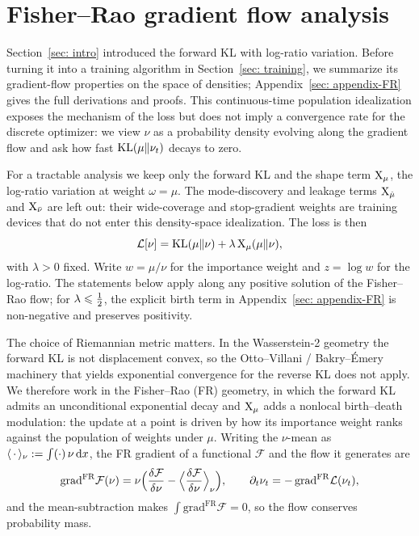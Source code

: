 \documentclass{article}
\begin{document}
\section{Fisher--Rao gradient flow analysis}
\label{sec: FR}
\label{subsec: FR-convergence}
\label{subsec: accuracy}

Section~\ref{sec: intro} introduced the forward KL with log-ratio variation. Before turning it into a training algorithm in Section~\ref{sec: training}, we summarize its gradient-flow properties on the space of densities; Appendix~\ref{sec: appendix-FR} gives the full derivations and proofs. This continuous-time population idealization exposes the mechanism of the loss but does not imply a convergence rate for the discrete optimizer: we view $\nu$ as a probability density evolving along the gradient flow and ask how fast $\mathrm{KL}(\mu\|\nu_t)$ decays to zero.

For a tractable analysis we keep only the forward KL and the shape term $\mathrm{X}_\mu$, the log-ratio variation at weight $\omega = \mu$. The mode-discovery and leakage terms $\mathrm{X}_{\hat\mu}$ and $\mathrm{X}_{\bar\nu}$ are left out: their wide-coverage and stop-gradient weights are training devices that do not enter this density-space idealization. The loss is then
\begin{equation}
    \mathcal L[\nu] = \mathrm{KL}(\mu\|\nu) + \lambda\,\mathrm{X}_\mu(\mu\|\nu),
    \label{eq: loss KL X}
\end{equation}
with $\lambda > 0$ fixed. Write $w = \mu/\nu$ for the importance weight and $z = \log w$ for the log-ratio. The statements below apply along any positive solution of the Fisher--Rao flow; for $\lambda\leqslant\tfrac12$, the explicit birth term in Appendix~\ref{sec: appendix-FR} is non-negative and preserves positivity.

The choice of Riemannian metric matters. In the Wasserstein-2 geometry the forward KL is not displacement convex, so the Otto--Villani / Bakry--{\'E}mery machinery that yields exponential convergence for the reverse KL does not apply. We therefore work in the Fisher--Rao (FR) geometry, in which the forward KL admits an unconditional exponential decay and $\mathrm{X}_\mu$ adds a nonlocal birth--death modulation: the update at a point is driven by how its importance weight ranks against the population of weights under $\mu$. Writing the $\nu$-mean as $\langle\,\cdot\,\rangle_\nu := \int (\cdot)\,\nu\,\mathrm{d} x$, the FR gradient of a functional $\mathcal F$ and the flow it generates are
\begin{equation}
    \mathrm{grad}^{\mathrm{FR}}\mathcal F(\nu) = \nu\Bigl(\frac{\delta\mathcal F}{\delta\nu} - \Bigl\langle\frac{\delta\mathcal F}{\delta\nu}\Bigr\rangle_\nu\Bigr),
    \qquad
    \partial_t\nu_t = -\,\mathrm{grad}^{\mathrm{FR}}\mathcal L(\nu_t),
    \label{eq: FR-gradient}
\end{equation}
and the mean-subtraction makes $\int \mathrm{grad}^{\mathrm{FR}}\mathcal F = 0$, so the flow conserves probability mass.
\end{document}
